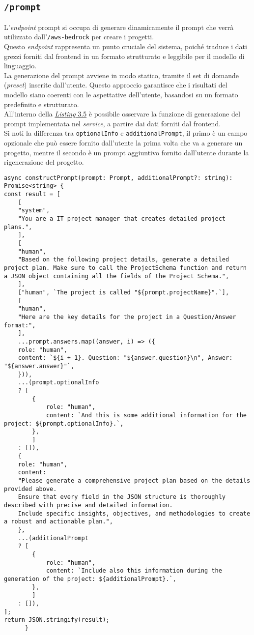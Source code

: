 \subsection*{\texttt{/prompt}}
L’\textit{endpoint} \gls{prompt} si occupa di generare dinamicamente il \gls{prompt} che verrà utilizzato dall’\texttt{/aws-bedrock} per creare i progetti.\\
Questo \textit{endpoint} rappresenta un punto cruciale del sistema, poiché traduce i dati grezzi forniti dal \gls{frontend} in un formato strutturato e leggibile per il modello di linguaggio.\\ 

\noindent La generazione del \gls{prompt} avviene in modo statico, tramite il set di domande (\textit{preset}) inserite dall'utente. Questo approccio garantisce che i risultati del modello siano coerenti con le aspettative dell'utente, basandosi su un formato predefinito e strutturato.\\
\noindent All'interno della {\hyperref[lst:funzione-prompt]{\textit{Listing} 3.5}} è possibile osservare la funzione di generazione del \gls{prompt} implementata nel \textit{service}, a partire dai dati forniti dal \gls{frontend}.\\
Si noti la differenza tra \texttt{optionalInfo} e \texttt{additionalPrompt}, il primo è un campo opzionale che può essere fornito dall'utente la prima volta che va a generare un progetto, mentre il secondo è un \gls{prompt} aggiuntivo fornito dall'utente durante la rigenerazione del progetto.

\begin{lstlisting}[caption={Funzione di costruzione del \gls{prompt}}, label={lst:funzione-prompt}]
async constructPrompt(prompt: Prompt, additionalPrompt?: string): Promise<string> {
const result = [
    [
    "system",
    "You are a IT project manager that creates detailed project plans.",
    ],
    [
    "human",
    "Based on the following project details, generate a detailed project plan. Make sure to call the ProjectSchema function and return a JSON object containing all the fields of the Project Schema.",
    ],
    ["human", `The project is called "${prompt.projectName}".`],
    [
    "human",
    "Here are the key details for the project in a Question/Answer format:",
    ],
    ...prompt.answers.map((answer, i) => ({
    role: "human",
    content: `${i + 1}. Question: "${answer.question}\n", Answer: "${answer.answer}"`,
    })),
    ...(prompt.optionalInfo
    ? [
        {
            role: "human",
            content: `And this is some additional information for the project: ${prompt.optionalInfo}.`,
        },
        ]
    : []),
    {
    role: "human",
    content:
    "Please generate a comprehensive project plan based on the details provided above. 
    Ensure that every field in the JSON structure is thoroughly described with precise and detailed information. 
    Include specific insights, objectives, and methodologies to create a robust and actionable plan.",
    },
    ...(additionalPrompt
    ? [
        {
            role: "human",
            content: `Include also this information during the generation of the project: ${additionalPrompt}.`,
        },
        ]
    : []),
];
return JSON.stringify(result);
      }
\end{lstlisting}
